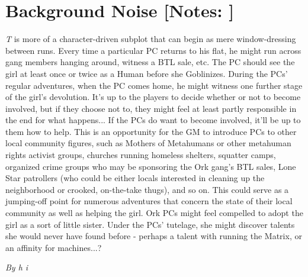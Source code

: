 \documentclass[letterpaper,twocolumn,10.5pt]{article}
\newenvironment{scenario}[6]
	{
		\section{#1 {\small[#2]}}
		\textit{#3}
		\def\TMPSCENARIO{#4 #5}
	}
	{\small\textit{By \TMPSCENARIO}}
\newcommand{\notes}{\textbf{Notes: }}
\begin{document}
\begin{scenario}{Background Noise}
\notes This is more of a character-driven subplot that can begin as mere window-dressing between runs. Every time a particular PC returns to his flat, he might run across gang members hanging around, witness a BTL sale, etc. The PC should see the girl at least once or twice as a Human before she Goblinizes. During the PCs' regular adventures, when the PC comes home, he might witness one further stage of the girl's devolution. It's up to the players to decide whether or not to become involved, but if they choose not to, they might feel at least partly responsible in the end for what happens... If the PCs do want to become involved, it'll be up to them how to help. This is an opportunity for the GM to introduce PCs to other local community figures, such as Mothers of Metahumans or other metahuman rights activist groups, churches running homeless shelters, squatter camps, organized crime groups who may be sponsoring the Ork gang's BTL sales, Lone Star patrollers (who could be either locals interested in cleaning up the neighborhood or crooked, on-the-take thugs), and so on. This could serve as a jumping-off point for numerous adventures that concern the state of their local community as well as helping the girl. Ork PCs might feel compelled to adopt the girl as a sort of little sister. Under the PCs' tutelage, she might discover talents she would never have found before - perhaps a talent with running the Matrix, or an affinity for machines...? 

\end{scenario}
\end{document}
